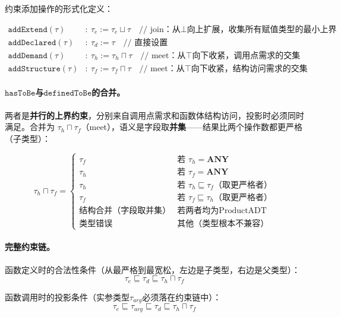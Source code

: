 \documentclass[UTF8]{article}
\newcommand{\ANY}{\mathbf{ANY}}
\newcommand{\hasToBe}{\texttt{hasToBe}}
\newcommand{\definedToBe}{\texttt{definedToBe}}
\begin{document}
\noindent 约束添加操作的形式化定义：

\begin{align}
\texttt{addExtend}(\tau)&:\ \tau_e := \tau_e \sqcup \tau \quad \text{// join：从$\bot$向上扩展，收集所有赋值类型的最小上界} \label{eq:addextend}\\
\texttt{addDeclared}(\tau)&:\ \tau_d := \tau \quad \text{// 直接设置} \label{eq:adddeclared}\\
\texttt{addDemand}(\tau)&:\ \tau_h := \tau_h \sqcap \tau \quad \text{// meet：从$\top$向下收紧，调用点需求的交集} \label{eq:adddemand}\\
\texttt{addStructure}(\tau)&:\ \tau_f := \tau_f \sqcap \tau \quad \text{// meet：从$\top$向下收紧，结构访问需求的交集} \label{eq:addstructure}
\end{align}

\paragraph{$\hasToBe$与$\definedToBe$的合并。}
两者是\textbf{并行的上界约束}，分别来自调用点需求和函数体结构访问，投影时必须同时满足。合并为 $\tau_h \sqcap \tau_f$（meet），语义是字段取\textbf{并集}——结果比两个操作数都更严格（子类型）：

\[
\tau_h \sqcap \tau_f = \begin{cases}
\tau_f & \text{若 } \tau_h = \ANY \\
\tau_h & \text{若 } \tau_f = \ANY \\
\tau_h & \text{若 } \tau_h \sqsubseteq \tau_f \text{（取更严格者）} \\
\tau_f & \text{若 } \tau_f \sqsubseteq \tau_h \text{（取更严格者）} \\
\text{结构合并（字段取并集）} & \text{若两者均为ProductADT} \\
\text{类型错误} & \text{其他（类型根本不兼容）}
\end{cases}
\]

\paragraph{完整约束链。}
函数定义时的合法性条件（从最严格到最宽松，左边是子类型，右边是父类型）：
\begin{equation}
\tau_e \sqsubseteq \tau_d \sqsubseteq \tau_h \sqcap \tau_f
\label{eq:chain-def}
\end{equation}

函数调用时的投影条件（实参类型$\tau_{\mathit{arg}}$必须落在约束链中）：
\begin{equation}
\tau_e \sqsubseteq \tau_{\mathit{arg}} \sqsubseteq \tau_d \sqsubseteq \tau_h \sqcap \tau_f
\label{eq:chain-call}
\end{equation}
\end{document}
